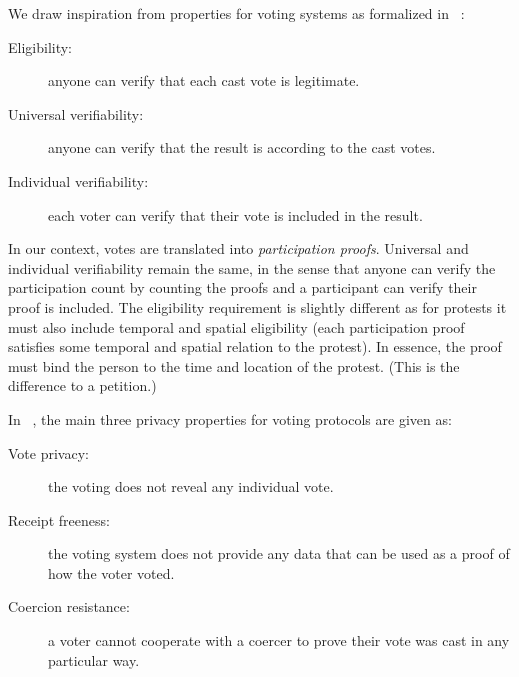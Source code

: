 We draw inspiration from properties for voting systems as formalized
in ~\cite{VerifyingPrivacyPropertiesOfVotingProtocols}:
\begin{description}
  \item[Eligibility:] anyone can verify that each cast vote is legitimate.
  \item[Universal verifiability:] anyone can verify that the result is according to the cast votes.
  \item[Individual verifiability:] each voter can verify that their vote is included in the result.
\end{description}
In our context, votes are translated into \emph{participation proofs}.
Universal and individual verifiability remain the same, in the sense that anyone can verify the participation count by counting the proofs and a participant can verify their proof is included.
The eligibility requirement is slightly different as for protests it must also
include temporal %
and spatial eligibility (\ie each participation proof satisfies some temporal 
and spatial relation to the protest).
In essence, the proof must bind the person to the time and location of the protest.
(This is the difference to a petition.)

In ~\cite{VerifyingPrivacyPropertiesOfVotingProtocols}, the main three
privacy properties for voting protocols are given as:
\begin{description}
  \item[Vote privacy:] the voting does not reveal any individual vote.
  \item[Receipt freeness:] the voting system does not provide any data that can be used as a proof of how the voter voted.
  \item[Coercion resistance:] a voter cannot cooperate with a coercer to prove their vote was cast in any particular way.
\end{description}


